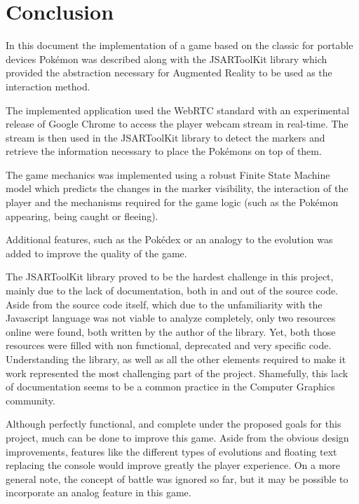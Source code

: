 \section{Conclusion}
\label{sec:conclusion}

In this document the implementation of a game based on the classic for portable devices Pokémon\textsuperscript{\textregistered} was described along with the JSARToolKit library which provided the abstraction necessary for Augmented Reality to be used as the interaction method.

The implemented application used the WebRTC standard with an experimental release of Google Chrome to access the player webcam stream in real-time. The stream is then used in the JSARToolKit library to detect the markers and retrieve the information necessary to place the Pokémons on top of them.

The game mechanics was implemented using a robust Finite State Machine model which predicts the changes in the marker visibility, the interaction of the player and the mechanisms required for the game logic (such as the Pokémon appearing, being caught or fleeing).

Additional features, such as the Pokédex or an analogy to the evolution was added to improve the quality of the game.

The JSARToolKit library proved to be the hardest challenge in this project, mainly due to the lack of documentation, both in and out of the source code. Aside from the source code itself, which due to the unfamiliarity with the Javascript language was not viable to analyze completely, only two resources online were found, both written by the author of the library. Yet, both those resources were filled with non functional, deprecated and very specific code. Understanding the library, as well as all the other elements required to make it work represented the most challenging part of the project. Shamefully, this lack of documentation seems to be a common practice in the Computer Graphics community.

Although perfectly functional, and complete under the proposed goals for this project, much can be done to improve this game. Aside from the obvious design improvements, features like the different types of evolutions and floating text replacing the console would improve greatly the player experience. On a more general note, the concept of battle was ignored so far, but it may be possible to incorporate an analog feature in this game.